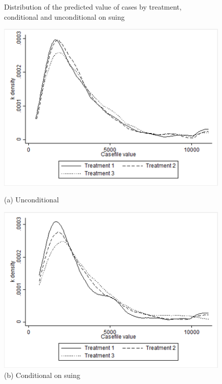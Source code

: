 \documentclass[12 pt]{article}
\begin{document}
\begin{figure}[H]%
  \centering
  \caption{Distribution of the predicted value of cases by treatment, conditional and unconditional on suing}
  \begin{minipage}[b]{0.4\textwidth}
    \includegraphics[width=\textwidth]{Figures/Figure4_1.png}
    \caption*{(a) Unconditional}
  \end{minipage}
  \begin{minipage}[b]{0.4\textwidth}
    \includegraphics[width=\textwidth]{Figures/Figure4_2.png}
    \caption*{(b) Conditional on suing}
  \end{minipage}
  \label{fig:4}
\end{figure}%
\end{document}
